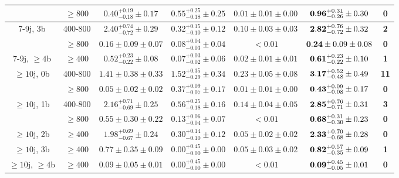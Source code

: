 \begin{table}[!ht]
{\begin{tabular}{c|c||c|c|c|c|c}
 & $\geq800$ & $0.40^{+0.19}_{-0.18}\pm0.17$ & $0.55^{+0.25}_{-0.18}\pm0.25$ & $0.01\pm0.01\pm0.00$ & ${\bf 0.96}^{+0.31}_{-0.26}\pm0.30$ & {\bf 0}\\ 
\hline
\multirow{2}{*}{7-9j, 3b} & 400-800 & $2.40^{+0.74}_{-0.72}\pm0.29$ & $0.32^{+0.15}_{-0.10}\pm0.12$ & $0.10\pm0.03\pm0.03$ & ${\bf 2.82}^{+0.76}_{-0.72}\pm0.32$ & {\bf 2}\\ 
 & $\geq800$ & $0.16\pm0.09\pm0.07$ & $0.08^{+0.04}_{-0.03}\pm0.04$ & $<0.01$ & ${\bf 0.24}\pm0.09\pm0.08$ & {\bf 0}\\ 
\hline
\multirow{1}{*}{7-9j, $\geq4$b} & $\geq400$ & $0.52^{+0.23}_{-0.22}\pm0.08$ & $0.07^{+0.03}_{-0.02}\pm0.06$ & $0.02\pm0.01\pm0.01$ & ${\bf 0.61}^{+0.23}_{-0.22}\pm0.10$ & {\bf 1}\\ 
\hline
\multirow{2}{*}{$\geq10$j, 0b} & 400-800 & $1.41\pm0.38\pm0.33$ & $1.52^{+0.35}_{-0.29}\pm0.34$ & $0.23\pm0.05\pm0.08$ & ${\bf 3.17}^{+0.52}_{-0.48}\pm0.49$ & {\bf 11}\\ 
 & $\geq800$ & $0.05\pm0.02\pm0.02$ & $0.37^{+0.09}_{-0.07}\pm0.17$ & $0.01\pm0.01\pm0.00$ & ${\bf 0.43}^{+0.09}_{-0.08}\pm0.17$ & {\bf 0}\\ 
\hline
\multirow{2}{*}{$\geq10$j, 1b} & 400-800 & $2.16^{+0.71}_{-0.69}\pm0.25$ & $0.56^{+0.25}_{-0.18}\pm0.16$ & $0.14\pm0.04\pm0.05$ & ${\bf 2.85}^{+0.76}_{-0.71}\pm0.31$ & {\bf 3}\\ 
 & $\geq800$ & $0.55\pm0.30\pm0.22$ & $0.13^{+0.06}_{-0.04}\pm0.07$ & $<0.01$ & ${\bf 0.68}^{+0.31}_{-0.30}\pm0.23$ & {\bf 0}\\ 
\hline
\multirow{1}{*}{$\geq10$j, 2b} & $\geq400$ & $1.98^{+0.69}_{-0.67}\pm0.24$ & $0.30^{+0.14}_{-0.10}\pm0.12$ & $0.05\pm0.02\pm0.02$ & ${\bf 2.33}^{+0.70}_{-0.68}\pm0.28$ & {\bf 0}\\ 
\hline
\multirow{1}{*}{$\geq10$j, 3b} & $\geq400$ & $0.77\pm0.35\pm0.09$ & $0.00^{+0.45}_{-0.00}\pm0.00$ & $0.05\pm0.03\pm0.02$ & ${\bf 0.82}^{+0.57}_{-0.35}\pm0.09$ & {\bf 1}\\ 
\hline
\multirow{1}{*}{$\geq10$j, $\geq4$b} & $\geq400$ & $0.09\pm0.05\pm0.01$ & $0.00^{+0.45}_{-0.00}\pm0.00$ & $<0.01$ & ${\bf 0.09}^{+0.45}_{-0.05}\pm0.01$ & {\bf 0}\\ 

\hline
\end{tabular}}
\end{table}


